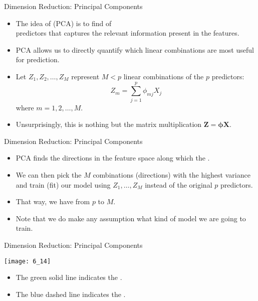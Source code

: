 \documentclass[mathserif, aspectratio=169]{beamer}
\begin{document}
\begin{frame}{Dimension Reduction: Principal Components}
	\begin{itemize}
		\item The idea of  (PCA) is to find
			 of \\
			predictors that captures the relevant information present in the features. 
		\item PCA allows us to directly quantify which linear combinations are most useful
			for prediction.
		\item Let $Z_1, Z_2, \dots, Z_M$ represent $M < p$ linear combinations of the 
			$p$ predictors:
			\[
				Z_m = \sum_{j=1}^p \phi_{mj} X_j
			\]
			where $ m = 1, 2, \dots, M$.
		\item Unsurprisingly, this is nothing but the matrix multiplication 
			$\bm{Z} = \bm{\phi X}$.
	\end{itemize}
\end{frame}

\begin{frame}{Dimension Reduction: Principal Components}
	\begin{itemize}
		\item PCA finds the directions in the feature space along which the .
		\item We can then pick the $M$ combinations (directions) with the highest variance
			and train (fit) our model using $Z_1, \dots, Z_M$ instead of the 
			original $p$ predictors.
		\item That way, we have  from $p$ to $M$.
		\item Note that we do  make any assumption what kind of model we are
			going to train.
	\end{itemize}
\end{frame}

\begin{frame}{Dimension Reduction: Principal Components}
	\vspace{-8mm}
	\begin{center}
		\texttt{[image: 6\_14]}
	\end{center}
	\vspace{-6mm}
	\begin{itemize}
		\item The green solid line indicates the .
		\item The blue dashed line indicates the .
	\end{itemize}
\end{frame}
\end{document}
